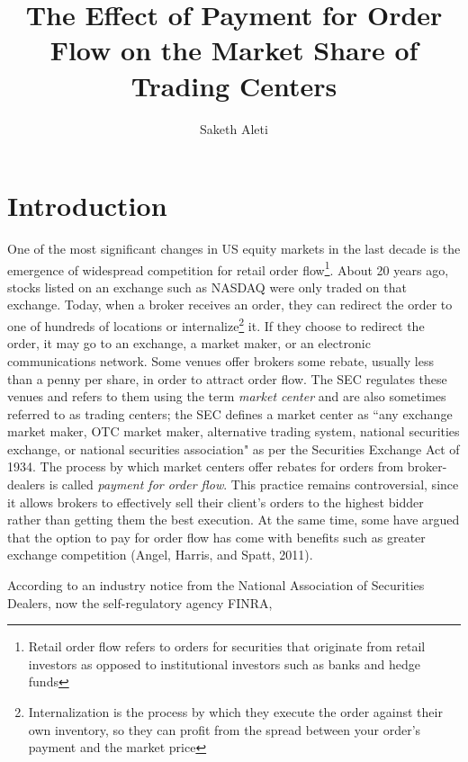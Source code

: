 \documentclass[12pt,a4paper]{article}
\begin{document}
	
\title{The Effect of Payment for Order Flow on the Market Share of Trading Centers}

\author{Saketh Aleti}

\maketitle

\section{Introduction}	
	
	One of the most significant changes in US equity markets in the last decade is the emergence of widespread competition for retail order flow\footnote{ Retail order flow refers to orders for securities that originate from retail investors as opposed to institutional investors such as banks and hedge funds}. About 20 years ago, stocks listed on an exchange such as NASDAQ were only traded on that exchange. Today, when a broker receives an order, they can redirect the order to one of hundreds of locations or internalize\footnote{ Internalization is the process by which they execute the order against their own inventory, so they can profit from the spread between your order's payment and the market price} it. If they choose to redirect the order, it may go to an exchange, a market maker, or an electronic communications network. Some venues offer brokers some rebate, usually less than a penny per share, in order to attract order flow. The SEC regulates these venues and refers to them using the term \textit{market center} and are also sometimes referred to as trading centers; the SEC defines a market center as ``any exchange market maker, OTC market maker, alternative trading system, national securities exchange, or national securities association" as per the Securities Exchange Act of 1934. The process by which market centers offer rebates for orders from broker-dealers is called \textit{payment for order flow}. This practice remains controversial, since it allows brokers to effectively sell their client's orders to the highest bidder rather than getting them the best execution. At the same time, some have argued that the option to pay for order flow has come with benefits such as greater exchange competition (Angel, Harris, and Spatt, 2011). 
	
	
	According to an industry notice from the National Association of Securities Dealers, now the self-regulatory agency FINRA,
	
\end{document}
